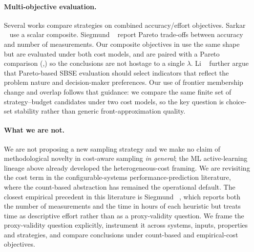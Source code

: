 \paragraph*{Multi-objective evaluation.}
Several works compare strategies on combined accuracy/effort
objectives. Sarkar \etal~\cite{sarkar2015} use a scalar composite. Siegmund
\etal~\cite{siegmund2015FSE} report Pareto trade-offs between accuracy and
number of measurements. Our composite objectives in
 use the same shape but are evaluated under both
cost models, and are paired with a Pareto comparison
(,) so the conclusions are not hostage
to a single $\lambda$. Li \etal~\cite{li2020pareto} further argue that
Pareto-based SBSE evaluation should select indicators that reflect the problem
nature and decision-maker preferences. Our use of frontier membership change
and overlap follows that guidance: we compare the same finite set of
strategy--budget candidates under two cost models, so the key question is
choice-set stability rather than generic front-approximation quality.

\paragraph*{What we are not.}
We are not proposing a new sampling strategy and we make no claim of
methodological novelty in cost-aware sampling \emph{in general}; the ML
active-learning lineage above already developed the heterogeneous-cost
framing. We are revisiting the cost term in the configurable-systems
performance-prediction literature, where the count-based abstraction has
remained the operational default. The closest empirical precedent in this
literature is Siegmund \etal~\cite{siegmund2012a}, which reports both the
number of measurements and the time in hours of each heuristic but treats
time as descriptive effort rather than as a proxy-validity question. We
frame the proxy-validity question explicitly, instrument it across systems,
inputs, properties and strategies, and compare conclusions under
count-based and empirical-cost objectives.
